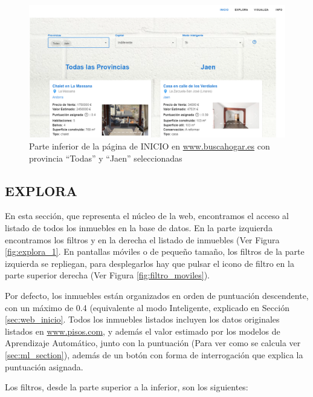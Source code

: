 \begin{figure}[ht]
    \centering
	\includegraphics[width=1\textwidth]{img/inicio_1.PNG}
	\caption[Parte inferior de la página de INICIO en \url{www.buscahogar.es}]{Parte inferior de la página de INICIO en \url{www.buscahogar.es} con provincia ``Todas'' y ``Jaen'' seleccionadas}
	\label{fig:inicio_1}
\end{figure}

\clearpage
\subsection{EXPLORA}{\label{sec:web_explora}}

En esta sección, que representa el núcleo de la web, encontramos el acceso al listado de todos los inmuebles en la base de datos. En la parte izquierda encontramos los filtros y en la derecha el listado de inmuebles (Ver Figura \ref{fig:explora_1}. En pantallas móviles o de pequeño tamaño, los filtros de la parte izquierda se repliegan, para desplegarlos hay que pulsar el icono de filtro en la parte superior derecha (Ver Figura \ref{fig:filtro_moviles}).

Por defecto, los inmuebles están organizados en orden de puntuación descendente, con un máximo de 0.4 (equivalente al modo Inteligente, explicado en Sección \ref{sec:web_inicio}. Todos los inmuebles listados incluyen los datos originales listados en \url{www.pisos.com}, y además el valor estimado por los modelos de Aprendizaje Automático, junto con la puntuación (Para ver como se calcula ver \ref{sec:ml_section}), además de un botón con forma de interrogación que explica la puntuación asignada.

Los filtros, desde la parte superior a la inferior, son los siguientes:

